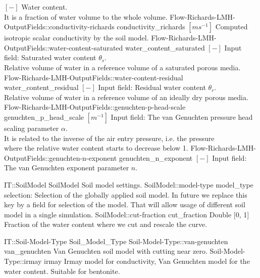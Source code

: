 \begin{SelectionType}
			{{{}{$[-]$}{ Water content.}\\{
                It is a fraction of water volume to the whole volume.}%
}}
		\SelectionItem
			{Flow-Richards-LMH-OutputFields::conductivity-richards}
			{conductivity{\_}richards}
			{{{}{$[ms^{-1}]$}{ Computed isotropic scalar conductivity by the soil model.}%
}}
		\SelectionItem
			{Flow-Richards-LMH-OutputFields::water-content-saturated}
			{water{\_}content{\_}saturated}
			{{{}{$[-]$}{ Input field: Saturated water content }{$ \theta_s $}{.}\\{
                Relative volume of water in a reference volume of a saturated porous media.}%
}}
		\SelectionItem
			{Flow-Richards-LMH-OutputFields::water-content-residual}
			{water{\_}content{\_}residual}
			{{{}{$[-]$}{ Input field: Residual water content }{$ \theta_r $}{.}\\{
                Relative volume of water in a reference volume of an ideally dry porous media.}%
}}
		\SelectionItem
			{Flow-Richards-LMH-OutputFields::genuchten-p-head-scale}
			{genuchten{\_}p{\_}head{\_}scale}
			{{{}{$[m^{-1}]$}{ Input field: The van Genuchten pressure head scaling parameter }{$ \alpha $}{.}\\{
                It is related to the inverse of the air entry pressure, i.e. the pressure}\\{
                where the relative water content starts to decrease below 1.}%
}}
		\SelectionItem
			{Flow-Richards-LMH-OutputFields::genuchten-n-exponent}
			{genuchten{\_}n{\_}exponent}
			{{{}{$[-]$}{ Input field: The van Genuchten exponent parameter }{$ n $}{.}%
}}
\end{SelectionType}
\begin{RecordType}
	{IT::SoilModel}
	{SoilModel}
	{}%
	{}%
	{{{Soil model settings.}%
}}
		\RecKey
			{SoilModel::model-type}
			{model{\_}type}
			{{selection: }}{}
			{ }
			{{{Selection of the globally applied soil model.
In future we replace this key by a field for selection of the model.
That will allow usage of different soil model in a single simulation.}%
}}
		\RecKey
			{SoilModel::cut-fraction}
			{cut{\_}fraction}
			{{Double [0, 1]}}{}
			{ }
			{{{Fraction of the water content where we cut  and rescale the curve.}%
}}
\end{RecordType}
\begin{SelectionType}
	{IT::Soil-Model-Type}
	{Soil{\_}Model{\_}Type}
	{}
		\SelectionItem
			{Soil-Model-Type::van-genuchten}
			{van{\_}genuchten}
			{{{Van Genuchten soil model with cutting near zero.}%
}}
		\SelectionItem
			{Soil-Model-Type::irmay}
			{irmay}
			{{{Irmay model for conductivity, Van Genuchten model for the water content.
Suitable for bentonite.}%
}}
\end{SelectionType}

